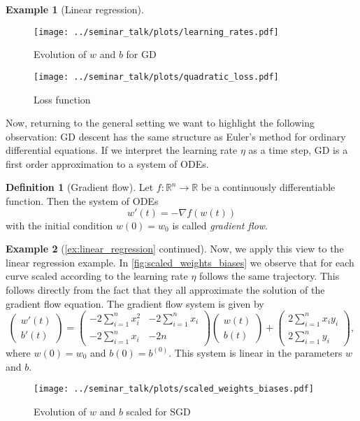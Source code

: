 \documentclass[12pt]{article}
\theoremstyle{definition}
\newtheorem{example}[example]{Example}
\newtheorem{definition}[definition]{Definition}
\numberwithin{equation}{section}
\newcommand{\R}{\mathbb{R}}
\begin{document}
\begin{example}[Linear regression]
  \begin{figure}[htb]
    \centering
    \texttt{[image: ../seminar\_talk/plots/learning\_rates.pdf]}
    \caption{Evolution of $w$ and $b$ for GD}
    \label{fig:learning_rates}
  \end{figure}

  \begin{figure}[htb]
    \centering
    \texttt{[image: ../seminar\_talk/plots/quadratic\_loss.pdf]}
    \caption{Loss function}
    \label{fig:quadratic_loss_function}
  \end{figure}
\end{example}
Now, returning to the general setting we want to highlight the following observation: GD descent has the same structure as Euler's method for ordinary differential equations. If we interpret the learning rate $\eta$ as a time step, GD is a first order approximation to a system of ODEs.
\begin{definition}[Gradient flow]
  Let $f : \R^n \rightarrow \R$ be a continuously differentiable function. Then the system of ODEs
  \begin{equation}
  w'(t) = - \nabla f(w(t))
  \end{equation}
  with the initial condition $w(0) = w_{0}$ is called \emph{gradient flow}.
\end{definition}
\begin{example}[\autoref{ex:linear_regression} continued]
  Now, we apply this view to the linear regression example. In \autoref{fig:scaled_weights_biases} we observe that for each curve scaled according to the learning rate $\eta$ follows the same trajectory. This follows directly from the fact that they all approximate the solution of the gradient flow equation. The gradient flow system is given by
  \begin{equation*}
    \begin{pmatrix}
      w'(t)      \\
      b'(t)     
  \end{pmatrix}
  = 
  \begin{pmatrix}
    -2  \displaystyle\sum_{i=1}^n x_i^2  &  -2  \displaystyle\sum_{i=1}^n x_i      \\
      -2  \displaystyle\sum_{i=1}^n x_i  &  -2n      
  \end{pmatrix}
  \begin{pmatrix}
    w(t)     \\
    b(t)    
  \end{pmatrix}
  +
  \begin{pmatrix}
    2  \displaystyle\sum_{i=1}^n x_i y_i     \\
    2  \displaystyle\sum_{i=1}^n y_i    
  \end{pmatrix},
  \end{equation*}
  where $w(0) = w_{0}$ and $b(0) = b^{(0)}$. This system is linear in the parameters $w$ and $b$.
  \begin{figure}[htb]
    \centering
    \texttt{[image: ../seminar\_talk/plots/scaled\_weights\_biases.pdf]}
    \caption{Evolution of $w$ and $b$ scaled for SGD}
    \label{fig:scaled_weights_biases}
  \end{figure}
\end{example}
\end{document}

